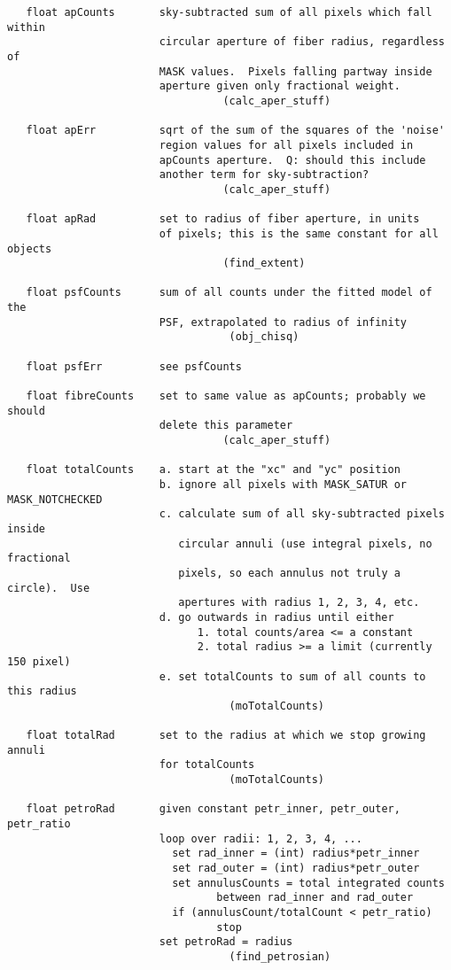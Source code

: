 \begin{verbatim}
   float apCounts       sky-subtracted sum of all pixels which fall within
                        circular aperture of fiber radius, regardless of
                        MASK values.  Pixels falling partway inside
                        aperture given only fractional weight.
                                  (calc_aper_stuff)

   float apErr          sqrt of the sum of the squares of the 'noise'
                        region values for all pixels included in 
                        apCounts aperture.  Q: should this include
                        another term for sky-subtraction?
                                  (calc_aper_stuff)

   float apRad          set to radius of fiber aperture, in units
                        of pixels; this is the same constant for all objects
                                  (find_extent)

   float psfCounts      sum of all counts under the fitted model of the 
                        PSF, extrapolated to radius of infinity
                                   (obj_chisq)

   float psfErr         see psfCounts

   float fibreCounts    set to same value as apCounts; probably we should
                        delete this parameter
                                  (calc_aper_stuff)

   float totalCounts    a. start at the "xc" and "yc" position
                        b. ignore all pixels with MASK_SATUR or MASK_NOTCHECKED
                        c. calculate sum of all sky-subtracted pixels inside
                           circular annuli (use integral pixels, no fractional
                           pixels, so each annulus not truly a circle).  Use
                           apertures with radius 1, 2, 3, 4, etc. 
                        d. go outwards in radius until either
                              1. total counts/area <= a constant
                              2. total radius >= a limit (currently 150 pixel)
                        e. set totalCounts to sum of all counts to this radius
                                   (moTotalCounts)

   float totalRad       set to the radius at which we stop growing annuli
                        for totalCounts
                                   (moTotalCounts)

   float petroRad       given constant petr_inner, petr_outer, petr_ratio
                        loop over radii: 1, 2, 3, 4, ...
                          set rad_inner = (int) radius*petr_inner
                          set rad_outer = (int) radius*petr_outer
                          set annulusCounts = total integrated counts
                                 between rad_inner and rad_outer
                          if (annulusCount/totalCount < petr_ratio)
                                 stop
                        set petroRad = radius
                                   (find_petrosian)


\end{verbatim}
